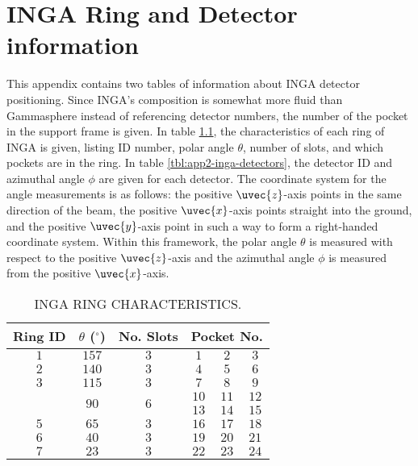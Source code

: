 %
%

\chapter{INGA Ring and Detector information}
\label{app:inga-rings-and-detectors}
This appendix contains two tables of information about INGA detector positioning. Since INGA's composition is somewhat more fluid than Gammasphere instead of referencing detector numbers, the number of the pocket in the support frame is given. In table \ref{tbl:app2-inga-rings}, the characteristics of each ring of INGA is given, listing ID number, polar angle $\theta$, number of slots, and which pockets are in the ring.  In table \ref{tbl:app2-inga-detectors}, the detector ID and azimuthal angle $\phi$ are given for each detector. The coordinate system for the angle measurements is as follows: the positive $\uvec{z}$-axis points in the same direction of the beam, the positive $\uvec{x}$-axis points straight into the ground, and the positive $\uvec{y}$-axis point in such a way to form a right-handed coordinate system. Within this framework, the polar angle $\theta$ is measured with respect to the positive $\uvec{z}$-axis and the azimuthal angle $\phi$ is measured from the positive $\uvec{x}$-axis.

\begin{table}
\caption{INGA RING CHARACTERISTICS.\label{tbl:app2-inga-rings}}
\begin{center}
\begin{tabular}{|c|c|c|c|c|c|}
\hline
\hline
Ring ID & $\theta$ ($^{\circ}$) & No. Slots&\multicolumn{3}{|c|}{Pocket No.}\\ 
\hline{}$1$&$157$&$3$&$1$&$2$&$3$\\
\hline{}$2$&$140$&$3$&$4$&$5$&$6$\\
\hline{}$3$&$115$&$3$&$7$&$8$&$9$\\
\hline{}\multirow{2}{*}{$4$}&\multirow{2}{*}{$90$}&\multirow{2}{*}{$6$}&$10$&$11$&$12$\\
&&&$13$&$14$&$15$\\
\hline{}$5$&$65$&$3$&$16$&$17$&$18$\\
\hline{}$6$&$40$&$3$&$19$&$20$&$21$\\
\hline{}$7$&$23$&$3$&$22$&$23$&$24$\\
\hline
\hline
\end{tabular}
\end{center}
\end{table}


